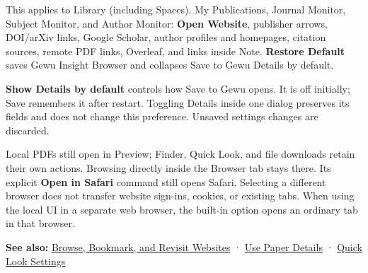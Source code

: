 \documentclass[10pt,letterpaper,oneside]{scrreprt}
\newenvironment{GewuRelated}{\par\nobreak\vspace{3pt}\nobreak\begingroup\small\sffamily\begin{samepage}\noindent}{\par\end{samepage}\endgroup}
\begin{document}
This applies to Library (including Spaces), My Publications, Journal Monitor, Subject Monitor, and Author Monitor: \textbf{Open Website}, publisher arrows, DOI/arXiv links, Google Scholar, author profiles and homepages, citation sources, remote PDF links, Overleaf, and links inside Note. \textbf{Restore Default} saves Gewu Insight Browser and collapses Save to Gewu Details by default.

\textbf{Show Details by default} controls how Save to Gewu opens. It is off initially; Save remembers it after restart. Toggling Details inside one dialog preserves its fields and does not change this preference. Unsaved settings changes are discarded.

Local PDFs still open in Preview; Finder, Quick Look, and file downloads retain their own actions. Browsing directly inside the Browser tab stays there. Its explicit \textbf{Open in Safari} command still opens Safari. Selecting a different browser does not transfer website sign-ins, cookies, or existing tabs. When using the local UI in a separate web browser, the built-in option opens an ordinary tab in that browser.

\begin{GewuRelated}
\textbf{See also:} \hyperref[browser]{Browse, Bookmark, and Revisit Websites} · \hyperref[paper-details]{Use Paper Details} · \hyperref[quick-look-settings]{Quick Look Settings}
\end{GewuRelated}
\end{document}
